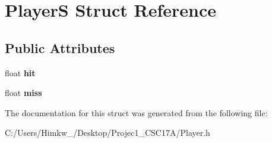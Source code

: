 \hypertarget{struct_player_s}{\section{Player\+S Struct Reference}
\label{struct_player_s}
}
\subsection*{Public Attributes}
\begin{DoxyCompactItemize}
\item 
\hypertarget{struct_player_s_a09e427a0831f9007a802bbe66d22b252}{float {\bfseries hit}}\label{struct_player_s_a09e427a0831f9007a802bbe66d22b252}

\item 
\hypertarget{struct_player_s_acffd9ec452ebf4389b9613d9f4c1d230}{float {\bfseries miss}}\label{struct_player_s_acffd9ec452ebf4389b9613d9f4c1d230}

\end{DoxyCompactItemize}


The documentation for this struct was generated from the following file\+:\begin{DoxyCompactItemize}
\item 
C\+:/\+Users/\+Himkw\+\_/\+Desktop/\+Projec1\+\_\+\+C\+S\+C17\+A/Player.\+h\end{DoxyCompactItemize}
